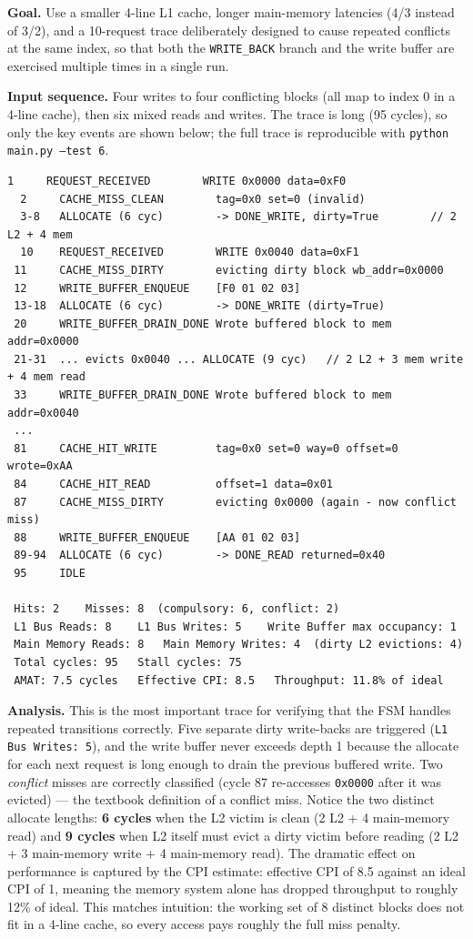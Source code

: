 \documentclass[11pt,a4paper]{article}
\begin{document}
\textbf{Goal.} Use a smaller 4-line L1 cache, longer main-memory latencies
(4/3 instead of 3/2), and a 10-request trace deliberately designed to cause
repeated conflicts at the same index, so that both the \texttt{WRITE\_BACK}
branch and the write buffer are exercised multiple times in a single run.

\textbf{Input sequence.} Four writes to four conflicting blocks (all map to
index 0 in a 4-line cache), then six mixed reads and writes. The trace is
long (95 cycles), so only the key events are shown below; the full trace is
reproducible with \texttt{python main.py --test 6}.

\begin{lstlisting}[style=trace]
  1     REQUEST_RECEIVED        WRITE 0x0000 data=0xF0
  2     CACHE_MISS_CLEAN        tag=0x0 set=0 (invalid)
  3-8   ALLOCATE (6 cyc)        -> DONE_WRITE, dirty=True        // 2 L2 + 4 mem
  10    REQUEST_RECEIVED        WRITE 0x0040 data=0xF1
 11     CACHE_MISS_DIRTY        evicting dirty block wb_addr=0x0000
 12     WRITE_BUFFER_ENQUEUE    [F0 01 02 03]
 13-18  ALLOCATE (6 cyc)        -> DONE_WRITE (dirty=True)
 20     WRITE_BUFFER_DRAIN_DONE Wrote buffered block to mem addr=0x0000
 21-31  ... evicts 0x0040 ... ALLOCATE (9 cyc)   // 2 L2 + 3 mem write + 4 mem read
 33     WRITE_BUFFER_DRAIN_DONE Wrote buffered block to mem addr=0x0040
 ...
 81     CACHE_HIT_WRITE         tag=0x0 set=0 way=0 offset=0 wrote=0xAA
 84     CACHE_HIT_READ          offset=1 data=0x01
 87     CACHE_MISS_DIRTY        evicting 0x0000 (again - now conflict miss)
 88     WRITE_BUFFER_ENQUEUE    [AA 01 02 03]
 89-94  ALLOCATE (6 cyc)        -> DONE_READ returned=0x40
 95     IDLE

 Hits: 2    Misses: 8  (compulsory: 6, conflict: 2)
 L1 Bus Reads: 8    L1 Bus Writes: 5    Write Buffer max occupancy: 1
 Main Memory Reads: 8   Main Memory Writes: 4  (dirty L2 evictions: 4)
 Total cycles: 95   Stall cycles: 75
 AMAT: 7.5 cycles   Effective CPI: 8.5   Throughput: 11.8% of ideal
\end{lstlisting}

\textbf{Analysis.} This is the most important trace for verifying that the
FSM handles repeated transitions correctly. Five separate dirty write-backs
are triggered (\texttt{L1 Bus Writes: 5}), and the write buffer never exceeds
depth 1 because the allocate for each next request is long enough to drain
the previous buffered write. Two \emph{conflict} misses are correctly
classified (cycle 87 re-accesses \texttt{0x0000} after it was evicted) —
the textbook definition of a conflict miss. Notice the two distinct allocate
lengths: \textbf{6 cycles} when the L2 victim is clean (2 L2 + 4 main-memory
read) and \textbf{9 cycles} when L2 itself must evict a dirty victim before
reading (2 L2 + 3 main-memory write + 4 main-memory read). The dramatic
effect on performance is captured by the CPI estimate: effective CPI of 8.5
against an ideal CPI of 1, meaning the memory system alone has dropped
throughput to roughly 12\% of ideal. This matches intuition: the working set
of 8 distinct blocks does not fit in a 4-line cache, so every access pays
roughly the full miss penalty.
\end{document}
